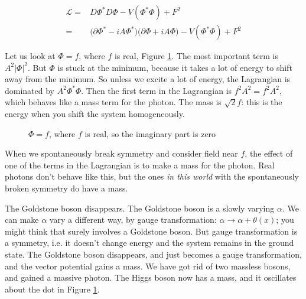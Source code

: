 \documentclass[]{article}
\begin{document}
\begin{align*}
	\mathcal{L} =& D\Phi^* D\Phi -V(\Phi^*\Phi) +F^2\\
	=& \big(\partial \Phi^* - i A \Phi^*\big) \big(\partial \Phi + i A \Phi\big) -V(\Phi^*\Phi) +F^2
\end{align*}

Let us look at $\Phi = f$, where $f$ is real, Figure \ref{fig:2-8-phi-f}. The most important term is $A^2 \lvert \Phi \rvert^2$. But $\Phi$ is stuck at the minimum, because it takes a lot of energy to shift away from the minimum. So unless we excite a lot of energy, the Lagrangian is dominated by $A^2 \Phi^*\Phi$. Then the first term in the Lagrangian is $f^2A^2=f^2A^2$, which behaves like a mass term for the photon. The mass is $\sqrt{2}f$: this is the energy when you shift the system homogeneously.
\begin{figure}[H]
	\begin{center}
		\caption[$\Phi = f$, where $f$ is real]{$\Phi = f$, where $f$ is real, so the imaginary part is zero}\label{fig:2-8-phi-f}
	\end{center}
\end{figure}

When we spontaneously break symmetry and consider field near $f$, the effect of one of the terms in the Lagrangian is to make a mass for the photon. Real photons don't behave like this, but the ones \emph{in this world} with the spontaneously broken symmetry do have a mass.

The Goldstone boson disappears. The Goldstone boson is a slowly varying $\alpha$. We can make $\alpha$ vary a different way, by gauge transformation: $\alpha\rightarrow\alpha+\theta(x)$; you might think that surely involves a Goldstone boson. But gauge transformation is a symmetry, i.e. it doesn't change energy and the system remains in the ground state. The Goldstone boson disappears, and just becomes a gauge transformation, and the vector potential gains a mass. We have got rid of two massless bosons, and gained a massive photon. The Higgs boson now has a mass, and it oscillates about the dot in Figure \ref{fig:2-8-phi-f}.
\end{document}
